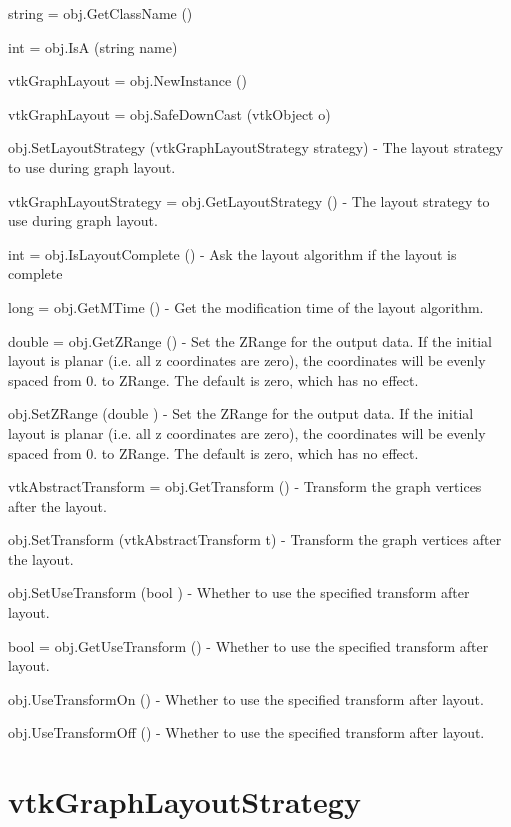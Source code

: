 \begin{DoxyItemize}
\item {\ttfamily string = obj.\-Get\-Class\-Name ()}  
\item {\ttfamily int = obj.\-Is\-A (string name)}  
\item {\ttfamily vtk\-Graph\-Layout = obj.\-New\-Instance ()}  
\item {\ttfamily vtk\-Graph\-Layout = obj.\-Safe\-Down\-Cast (vtk\-Object o)}  
\item {\ttfamily obj.\-Set\-Layout\-Strategy (vtk\-Graph\-Layout\-Strategy strategy)} -\/ The layout strategy to use during graph layout.  
\item {\ttfamily vtk\-Graph\-Layout\-Strategy = obj.\-Get\-Layout\-Strategy ()} -\/ The layout strategy to use during graph layout.  
\item {\ttfamily int = obj.\-Is\-Layout\-Complete ()} -\/ Ask the layout algorithm if the layout is complete  
\item {\ttfamily long = obj.\-Get\-M\-Time ()} -\/ Get the modification time of the layout algorithm.  
\item {\ttfamily double = obj.\-Get\-Z\-Range ()} -\/ Set the Z\-Range for the output data. If the initial layout is planar (i.\-e. all z coordinates are zero), the coordinates will be evenly spaced from 0. to Z\-Range. The default is zero, which has no effect.  
\item {\ttfamily obj.\-Set\-Z\-Range (double )} -\/ Set the Z\-Range for the output data. If the initial layout is planar (i.\-e. all z coordinates are zero), the coordinates will be evenly spaced from 0. to Z\-Range. The default is zero, which has no effect.  
\item {\ttfamily vtk\-Abstract\-Transform = obj.\-Get\-Transform ()} -\/ Transform the graph vertices after the layout.  
\item {\ttfamily obj.\-Set\-Transform (vtk\-Abstract\-Transform t)} -\/ Transform the graph vertices after the layout.  
\item {\ttfamily obj.\-Set\-Use\-Transform (bool )} -\/ Whether to use the specified transform after layout.  
\item {\ttfamily bool = obj.\-Get\-Use\-Transform ()} -\/ Whether to use the specified transform after layout.  
\item {\ttfamily obj.\-Use\-Transform\-On ()} -\/ Whether to use the specified transform after layout.  
\item {\ttfamily obj.\-Use\-Transform\-Off ()} -\/ Whether to use the specified transform after layout.  
\end{DoxyItemize}\hypertarget{vtkinfovis_vtkgraphlayoutstrategy}{}\section{vtk\-Graph\-Layout\-Strategy}\label{vtkinfovis_vtkgraphlayoutstrategy}
